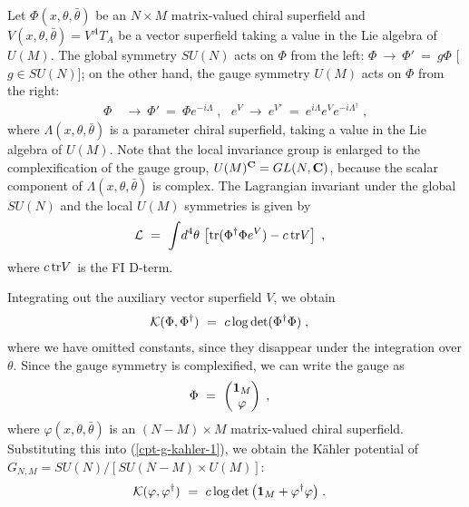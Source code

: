 \documentclass[a4paper,11pt]{article}
\newcommand{\kahler}{K\"{a}hler }
\newcommand{\tr}{{\rm tr}}
\begin{document}
{Let $\Phi (x, \theta, \bar{\theta})$ be an $N \times M$ matrix-valued
chiral superfield and 
$V (x, \theta, \bar{\theta}) = V^A T_A$ be 
a vector superfield taking a value in 
the Lie algebra of $U(M)$.
The global symmetry $SU(N)$ acts on $\Phi$ from the left:  
$\Phi \ \to \ \Phi' \ = \ g \Phi$ [$g \in SU(N)$]; 
on the other hand,  
the gauge symmetry $U(M)$ acts on $\Phi$ from the right: 
\begin{align}
\Phi \ &\to \ \Phi' 
\ = \ 
\Phi e^{-i \Lambda} \; , \ \ \ 
e^V \ \to \ e^{V'} \ = \ e^{i \Lambda} e^V e^{-i \Lambda^{\dagger}} \; ,
\end{align}
where $\Lambda (x, \theta, \bar{\theta})$ is a parameter 
chiral superfield, taking a value in the Lie algebra of $U(M)$. 
Note that the local invariance group is enlarged to 
the complexification of the gauge group, 
$U(M)^{\bf C}=GL(N,{\bf C})$, 
because the scalar component of 
$\Lambda (x,\theta, \bar{\theta})$ is complex. 
The Lagrangian invariant under the global $SU(N)$ and 
the local $U(M)$ symmetries is given by 
\begin{align}
{\cal L} 
\ &= \ 
\int \! d^4 \theta \,
\left[
\tr (\Phi^{\dagger} \Phi e^V) - c \, \tr V \right] \; , 
\label{compact-G}
\end{align}
where $c \, \tr V$ is the FI D-term. 

Integrating out the auxiliary vector superfield $V$,
we obtain 
\begin{align}
{\cal K} (\Phi, \Phi^{\dagger}) 
\ &= \ 
c \log \det (\Phi^{\dagger} \Phi) \; , \label{cpt-g-kahler-1}
\end{align}
where we have omitted constants, since they disappear 
under the integration over $\theta$. 
Since the gauge symmetry is complexified,
we can write the gauge as
\begin{align}
\Phi \ &= \ \begin{pmatrix}
{\bf 1}_M \cr 
 \varphi 
\end{pmatrix} \; ,
\end{align}
where $\varphi (x, \theta, \bar{\theta})$ is an $(N-M) \times M$
matrix-valued chiral superfield. 
Substituting this into (\ref{cpt-g-kahler-1}),
we obtain the \kahler potential of 
$G_{N,M}=SU(N)/[SU(N-M)\times U(M)]$:
\begin{align}
{\cal K} (\varphi, \varphi^{\dagger}) 
\ &= \ 
c \log \det \big( {\bf 1}_M + \varphi^{\dagger} \varphi \big) \; . 
\label{cpt-g-Kahler}
\end{align}

}
\end{document}
